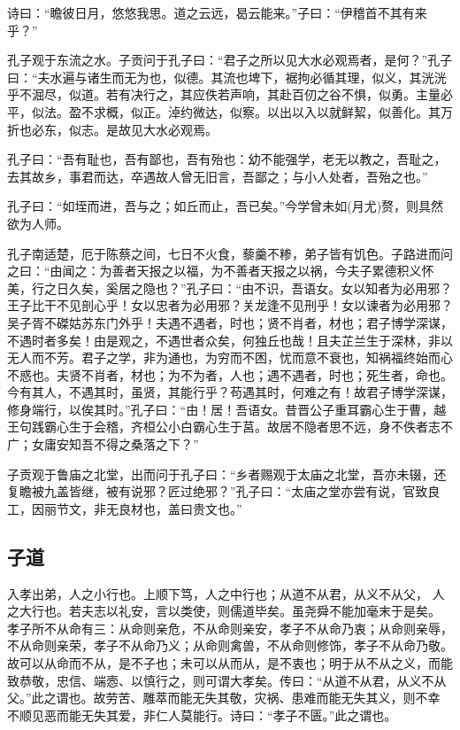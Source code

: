 \documentclass[]{article}
\begin{document}
诗曰：``瞻彼日月，悠悠我思。道之云远，曷云能来。''子曰：``伊稽首不其有来乎？''

孔子观于东流之水。子贡问于孔子曰：``君子之所以见大水必观焉者，是何？''孔子曰：``夫水遍与诸生而无为也，似德。其流也埤下，裾拘必循其理，似义，其洸洸乎不淈尽，似道。若有决行之，其应佚若声响，其赴百仞之谷不惧，似勇。主量必平，似法。盈不求概，似正。淖约微达，似察。以出以入以就鲜絜，似善化。其万折也必东，似志。是故见大水必观焉。

孔子曰：``吾有耻也，吾有鄙也，吾有殆也：幼不能强学，老无以教之，吾耻之，去其故乡，事君而达，卒遇故人曾无旧言，吾鄙之；与小人处者，吾殆之也。''

孔子曰：``如垤而进，吾与之；如丘而止，吾已矣。''今学曾未如(月尤)赘，则具然欲为人师。

孔子南适楚，厄于陈蔡之间，七日不火食，藜羹不糁，弟子皆有饥色。子路进而问之曰：``由闻之：为善者天报之以福，为不善者天报之以祸，今夫子累德积义怀美，行之日久矣，奚居之隐也？''孔子曰：``由不识，吾语女。女以知者为必用邪？王子比干不见剖心乎！女以忠者为必用邪？关龙逢不见刑乎！女以谏者为必用邪？吴子胥不磔姑苏东门外乎！夫遇不遇者，时也；贤不肖者，材也；君子博学深谋，不遇时者多矣！由是观之，不遇世者众矣，何独丘也哉！且夫芷兰生于深林，非以无人而不芳。君子之学，非为通也，为穷而不困，忧而意不衰也，知祸福终始而心不惑也。夫贤不肖者，材也；为不为者，人也；遇不遇者，时也；死生者，命也。今有其人，不遇其时，虽贤，其能行乎？苟遇其时，何难之有！故君子博学深谋，修身端行，以俟其时。''孔子曰：``由！居！吾语女。昔晋公子重耳霸心生于曹，越王句践霸心生于会稽，齐桓公小白霸心生于莒。故居不隐者思不远，身不佚者志不广；女庸安知吾不得之桑落之下？''

子贡观于鲁庙之北堂，出而问于孔子曰：``乡者赐观于太庙之北堂，吾亦未辍，还复瞻被九盖皆继，被有说邪？匠过绝邪？''孔子曰：``太庙之堂亦尝有说，官致良工，因丽节文，非无良材也，盖曰贵文也。''

\hypertarget{header-n124}{%
\subsection{子道}\label{header-n124}}

入孝出弟，人之小行也。上顺下笃，人之中行也；从道不从君，从义不从父，
人之大行也。若夫志以礼安，言以类使，则儒道毕矣。虽尧舜不能加毫末于是矣。
孝子所不从命有三：从命则亲危，不从命则亲安，孝子不从命乃衷；从命则亲辱，
不从命则亲荣，孝子不从命乃义；从命则禽兽，不从命则修饰，孝子不从命乃敬。
故可以从命而不从，是不子也；未可以从而从，是不衷也；明于从不从之义，而能
致恭敬，忠信、端悫、以慎行之，则可谓大孝矣。传曰：``从道不从君，从义不从
父。''此之谓也。故劳苦、雕萃而能无失其敬，灾祸、患难而能无失其义，则不幸
不顺见恶而能无失其爱，非仁人莫能行。诗曰：``孝子不匮。''此之谓也。
\end{document}
